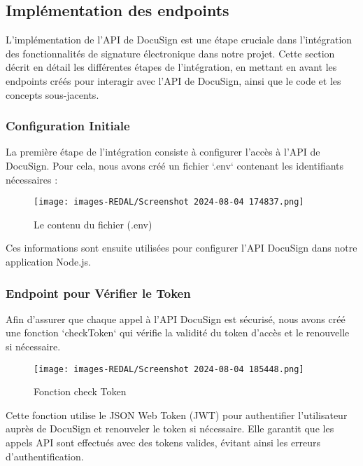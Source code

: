 \subsection{Implémentation des endpoints}

L'implémentation de l'API de DocuSign est une étape cruciale dans l'intégration des fonctionnalités de signature électronique dans notre projet. Cette section décrit en détail les différentes étapes de l'intégration, en mettant en avant les endpoints créés pour interagir avec l'API de DocuSign, ainsi que le code et les concepts sous-jacents.

\subsubsection{Configuration Initiale}

La première étape de l'intégration consiste à configurer l'accès à l'API de DocuSign. Pour cela, nous avons créé un fichier `.env` contenant les identifiants nécessaires :
\begin{figure}[H]
\begin{center}
\texttt{[image: images-REDAL/Screenshot 2024-08-04 174837.png]}
\end{center}
\caption{Le contenu du fichier (.env) }
\end{figure}



Ces informations sont ensuite utilisées pour configurer l'API DocuSign dans notre application Node.js.



\subsubsection{Endpoint pour Vérifier le Token}

Afin d'assurer que chaque appel à l'API DocuSign est sécurisé, nous avons créé une fonction `checkToken` qui vérifie la validité du token d'accès et le renouvelle si nécessaire.

\begin{figure}[H]
\begin{center}
\texttt{[image: images-REDAL/Screenshot 2024-08-04 185448.png]}
\end{center}
\caption{Fonction check Token}
\end{figure}


Cette fonction utilise le JSON Web Token (JWT) pour authentifier l'utilisateur auprès de DocuSign et renouveler le token si nécessaire. Elle garantit que les appels API sont effectués avec des tokens valides, évitant ainsi les erreurs d'authentification.

